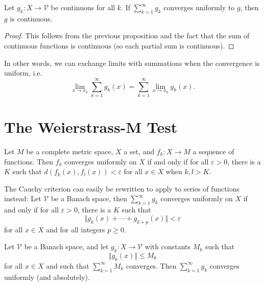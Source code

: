 \documentclass[10pt]{report}
\begin{document}
\begin{cor}
	Let $g_k: X \to \mathcal{V}$ be continuous for all $k$. If $\sum_{k=1}^{\infty} g_k$ converges uniformly to $g$, then $g$ is continuous.
\end{cor}
\begin{proof}
	This follows from the previous proposition and the fact that the sum of continuous functions is continuous (so each partial sum is continuous).
\end{proof}

\begin{note}[]
In other words, we can exchange limits with summations when the convergence is uniform, i.e.
\[
	\lim_{x \to x_0} \sum_{k=1}^{\infty} g_k(x) = \sum_{k=1}^{\infty} \lim_{x \to x_0} g_k(x).
\] 
\end{note}



\section{The Weierstrass-M Test}

\begin{thrm}
	Let $M$ be a complete metric space, $X$ a set, and $f_k: X \to M$ a sequence of functions. Then $f_k$ converges uniformly on $X$ if and only if for all $\varepsilon > 0$, there is a $K$ such that $d(f_k(x), f_l(x)) < \varepsilon$ for all $x \in X$ when $k,l > K$.
\end{thrm}

The Cauchy criterion can easily be rewritten to apply to series of functions instead: Let $\mathcal{V}$ be a Banach space, then $\sum_{k=1}^{\infty} g_k$ converges uniformly on $X$ if and only if for all $\varepsilon>0$, there is a $K$ such that
\[
	\Vert{g_k(x) + \cdots + g_{k+p}(x)}\Vert< \varepsilon
\] for all $x \in X$ and for all integers $p \geq 0$.

\begin{thrm}
	Let $\mathcal{V}$ be a Banach space, and let $g_k : X \to \mathcal{V}$ with constants $M_k$ such that
	\[
		\Vert{g_k(x)}\Vert\leq M_k
	\] for all $x \in X$ and such that $\sum_{k=1}^{\infty} M_k$ converges. Then $\sum_{k=1}^{\infty} g_k$ converges uniformly (and absolutely).
\end{thrm}

\end{document}
